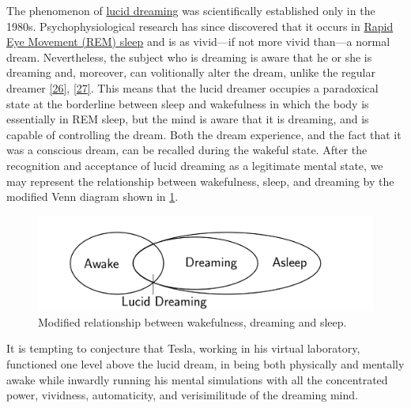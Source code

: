 \documentclass[
  12pt,
  british,
  a4paper,
  rgb,
  dvipsnames,
  svgnames,
  hyphens]{article}
\begin{document}
The phenomenon of \href{https://en.wikipedia.org/wiki/Lucid_dream}{lucid
dreaming} was scientifically established only in the 1980s.
Psychophysiological research has since discovered that it occurs in
\href{https://en.wikipedia.org/wiki/Rapid_eye_movement_sleep}{Rapid Eye
Movement (REM) sleep} and is as vivid---if not more vivid than---a
normal dream. Nevertheless, the subject who is dreaming is aware that he
or she is dreaming and, moreover, can volitionally alter the dream,
unlike the regular dreamer \protect\hyperlink{ref-laberge85}{{[}26{]}},
\protect\hyperlink{ref-laberge2000}{{[}27{]}}. This means that the lucid
dreamer occupies a paradoxical state at the borderline between sleep and
wakefulness in which the body is essentially in REM sleep, but the mind
is aware that it is dreaming, and is capable of controlling the dream.
Both the dream experience, and the fact that it was a conscious dream,
can be recalled during the wakeful state. After the recognition and
acceptance of lucid dreaming as a legitimate mental state, we may
represent the relationship between wakefulness, sleep, and dreaming by
the modified Venn diagram shown in \cref{fig:lucid}.

\begin{figure}
\hypertarget{fig:lucid}{%
\centering
\includegraphics[width=1\textwidth,height=\textheight]{images/lucid.svg}
\caption[Modified relationship between wakefulness, dreaming and
sleep.]{Modified relationship between wakefulness, dreaming and
sleep.\footnotemark{}}\label{fig:lucid}
}
\end{figure}

It is tempting to conjecture that Tesla, working in his virtual
laboratory, functioned one level above the lucid dream, in being both
physically and mentally awake while inwardly running his mental
simulations with all the concentrated power, vividness, automaticity,
and verisimilitude of the dreaming mind.
\end{document}
